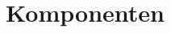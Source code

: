 \documentclass[.../Dokumentation.tex]{subfiles}
\begin{document}
\section{Komponenten}\label{sec-components}
\end{document}
